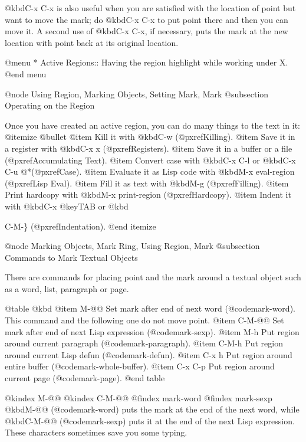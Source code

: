 {{  @kbd{C-x C-x} is also useful when you are satisfied with the location of
point but want to move the mark; do @kbd{C-x C-x} to put point there and
then you can move it.  A second use of @kbd{C-x C-x}, if necessary, puts
the mark at the new location with point back at its original location.

@menu
* Active Regions::  Having the region highlight while working under X.
@end menu

@node Using Region, Marking Objects, Setting Mark, Mark
@subsection Operating on the Region

  Once you have created an active region, you can do many things to
the text in it:
@itemize @bullet
@item
Kill it with @kbd{C-w} (@pxref{Killing}).
@item
Save it in a register with @kbd{C-x x} (@pxref{Registers}).
@item
Save it in a buffer or a file (@pxref{Accumulating Text}).
@item
Convert case with @kbd{C-x C-l} or @kbd{C-x C-u} @*(@pxref{Case}).
@item
Evaluate it as Lisp code with @kbd{M-x eval-region} (@pxref{Lisp Eval}).
@item
Fill it as text with @kbd{M-g} (@pxref{Filling}).
@item
Print hardcopy with @kbd{M-x print-region} (@pxref{Hardcopy}).
@item
Indent it with @kbd{C-x @key{TAB}} or @kbd{C-M-\} (@pxref{Indentation}).
@end itemize

@node Marking Objects, Mark Ring, Using Region, Mark
@subsection Commands to Mark Textual Objects

  There are commands for placing point and the mark around a textual
object such as a word, list, paragraph or page.
 
@table @kbd
@item M-@@
Set mark after end of next word (@code{mark-word}).  This command and
the following one do not move point.
@item C-M-@@
Set mark after end of next Lisp expression (@code{mark-sexp}).
@item M-h
Put region around current paragraph (@code{mark-paragraph}).
@item C-M-h
Put region around current Lisp defun (@code{mark-defun}).
@item C-x h
Put region around entire buffer (@code{mark-whole-buffer}).
@item C-x C-p
Put region around current page (@code{mark-page}).
@end table

@kindex M-@@
@kindex C-M-@@
@findex mark-word
@findex mark-sexp
@kbd{M-@@} (@code{mark-word}) puts the mark at the end of the next word,
while @kbd{C-M-@@} (@code{mark-sexp}) puts it at the end of the next Lisp
expression. These characters sometimes save you some typing.

}}}
